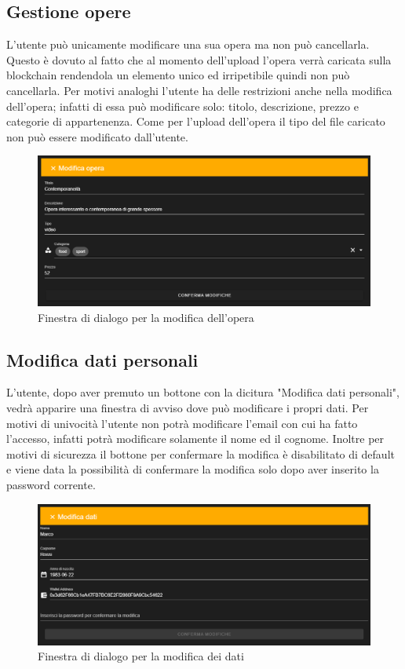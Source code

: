 \subsection{Gestione opere}
L'utente può unicamente modificare una sua opera ma non può cancellarla. Questo è dovuto al fatto che al momento dell'upload l'opera verrà caricata sulla blockchain rendendola un elemento unico ed irripetibile quindi non può cancellarla. Per motivi analoghi l'utente ha delle restrizioni anche nella modifica dell'opera; infatti di essa può modificare solo: titolo, descrizione, prezzo e categorie di appartenenza. Come per l'upload dell'opera il tipo del file caricato non può essere modificato dall'utente.
\begin{figure}[H]
	\begin{center}
		\includegraphics[width=0.7\columnwidth]{immagini/modificaOpera.png}
		\caption{Finestra di dialogo per la modifica dell'opera}
	\end{center}
\end{figure}
\subsection{Modifica dati personali}
L'utente, dopo aver premuto un bottone con la dicitura "Modifica dati personali", vedrà apparire una finestra di avviso dove può modificare i propri dati. Per motivi di univocità l'utente non potrà modificare l'email con cui ha fatto l'accesso, infatti potrà modificare solamente il nome ed il cognome. Inoltre per motivi di sicurezza il bottone per confermare la modifica è disabilitato di default e viene data la possibilità di confermare la modifica solo dopo aver inserito la password corrente.
\begin{figure}[H]
	\begin{center}
		\includegraphics[width=0.6\columnwidth]{immagini/modificaDati.png}
		\caption{Finestra di dialogo per la modifica dei dati}
	\end{center}
\end{figure}
